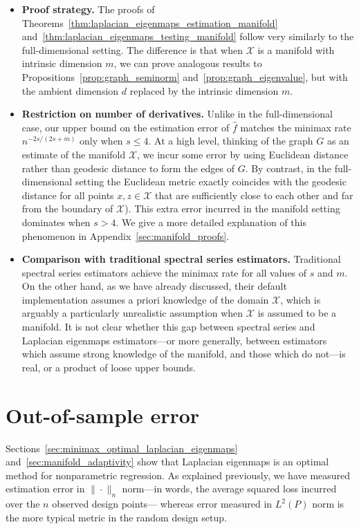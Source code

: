 \documentclass{article}
\newcommand{\1}{\mathbf{1}}
\newcommand{\mc}[1]{\mathcal{#1}}
\newcommand{\wh}[1]{\widehat{#1}}
\theoremstyle{alden}
\theoremstyle{aldenthm}
\theoremstyle{definition}
\theoremstyle{remark}
\begin{document}
\begin{itemize}
	\item \textbf{Proof strategy.} The proofs of Theorems~\ref{thm:laplacian_eigenmaps_estimation_manifold} and~\ref{thm:laplacian_eigenmaps_testing_manifold} follow very similarly to the full-dimensional setting. The difference is that when $\mc{X}$ is a manifold with intrinsic dimension $m$, we can prove analogous results to Propositions~\ref{prop:graph_seminorm} and~\ref{prop:graph_eigenvalue}, but with the ambient dimension $d$ replaced by the intrinsic dimension $m$. 
	\item \textbf{Restriction on number of derivatives.} Unlike in the full-dimensional case, our upper bound on the estimation error of $\wh{f}$ matches the minimax rate $n^{-2s/(2s + m)}$ only when $s \leq 4$. At a high level, thinking of the graph $G$ as an estimate of the manifold $\mc{X}$, we incur some error by using Euclidean distance rather than geodesic distance to form the edges of $G$. By contrast, in the full-dimensional setting the Euclidean metric exactly coincides with the geodesic distance for all points $x,z \in \mc{X}$ that are sufficiently close to each other and far from the boundary of $\mc{X}$). This extra error incurred in the manifold setting dominates when $s > 4$. We give a more detailed explanation of this phenomenon in Appendix~\ref{sec:manifold_proofs}.
	\item \textbf{Comparison with traditional spectral series estimators.} Traditional spectral series estimators achieve the minimax rate for all values of $s$ and $m$. On the other hand, as we have already discussed, their default implementation assumes a priori knowledge of the domain $\mc{X}$, which is arguably a particularly unrealistic assumption when $\mc{X}$ is assumed to be a manifold. It is not clear whether this gap between spectral series and Laplacian eigenmaps estimators---or more generally, between estimators which assume strong knowledge of the manifold, and those which do not---is real, or a product of loose upper bounds. 
\end{itemize}

\section{Out-of-sample error}
\label{sec:out_of_sample}
Sections~\ref{sec:minimax_optimal_laplacian_eigenmaps} and~\ref{sec:manifold_adaptivity} show that Laplacian eigenmaps is an optimal method for nonparametric regression. As explained previously, we have measured estimation error in $\|\cdot\|_n$ norm---in words, the average squared loss incurred over the $n$ observed design points--- whereas error measured in $L^2(P)$ norm is the more typical metric in the random design setup.
\end{document}
